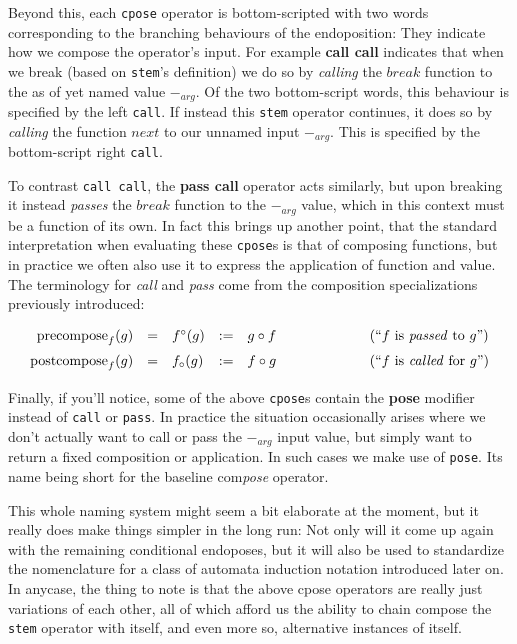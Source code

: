 \documentclass[twoside]{article}
\newcommand{\strong}[1]{{\bfseries #1}}
\newcommand{\col}[1][0ex]{& \hspace{#1}}
\newcommand{\precompose}[1]{\ensuremath{\mbox{precompose}_{#1}}}
\newcommand{\postcompose}[1]{\ensuremath{\mbox{postcompose}_{#1}}}
\begin{document}
Beyond this, each \texttt{cpose} operator is bottom-scripted with two words corresponding to the branching behaviours
of the endoposition: They indicate how we compose the operator's input. For example \strong{call call} indicates that
when we break (based on \texttt{stem}'s definition) we do so by \emph{calling} the $ break $ function to the as of yet
named value $ -_{arg} $. Of the two bottom-script words, this behaviour is specified by the left \texttt{call}.
If instead this \texttt{stem} operator continues, it does so by \emph{calling} the function $ next $ to our
unnamed input $ -_{arg} $. This is specified by the bottom-script right \texttt{call}.

To contrast \texttt{call call}, the \strong{pass call} operator acts similarly, but upon breaking it instead \emph{passes}
the $ break $ function to the $ -_{arg} $ value, which in this context must be a function of its own. In fact this brings up
another point, that the standard interpretation when evaluating these \texttt{cpose}s is that of composing functions, but in
practice we often also use it to express the application of function and value. The terminology for \emph{call} and \emph{pass}
come from the composition
specializations previously introduced:
$$ \def\arraystretch{1.5}
\begin{array}{rclcll}
\precompose{f}(g)	& = & f^\circ(g) & := & g \circ f \col[2cm] \mbox{(``$ f $ is \emph{passed} to $ g $'')}		\\
\postcompose{f}(g)	& = & f_\circ(g) & := & f \circ g \col[2cm] \mbox{(``$ f $ is \emph{called} for $ g $'')}
\end{array} $$

Finally, if you'll notice, some of the above \texttt{cpose}s contain the \strong{pose} modifier instead of \texttt{call} or
\texttt{pass}. In practice the situation occasionally arises where we don't actually want to call or pass the $ -_{arg} $
input value, but simply want to return a fixed composition or application. In such cases we make use of \texttt{pose}.
Its name being short for the baseline com\emph{pose} operator.

This whole naming system might seem a bit elaborate at the moment, but it really does make things simpler in the long
run: Not only will it come up again with the remaining conditional endoposes, but it will also be used to standardize
the nomenclature for a class of automata induction notation introduced later on. In anycase, the thing to note
is that the above cpose operators are really just variations of each other, all of which afford us the ability
to chain compose the \texttt{stem} operator with itself, and even more so, alternative instances of itself.
\end{document}
